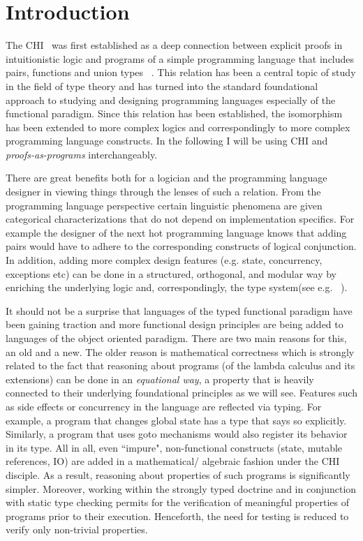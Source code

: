 \chapter{Introduction}\label{intro}
The \acrfull{CHI}~\cite{curry1934functionality,howard1995formulae} was first established as a deep connection between explicit proofs in intuitionistic logic and programs of a simple programming 
language that includes pairs, functions and union types ~\cite{Pierce:2002:TPL:509043,Srensen98lectureson}. This relation has been a central topic of study in the field of type theory and has turned into the standard
foundational approach to studying and designing programming languages especially of the functional paradigm. Since  this relation has been  established, the 
isomorphism has been extended to more complex logics and correspondingly to more complex programming language constructs.  
In the following I will be using \acrfull{CHI} and \emph{proofs-as-programs} interchangeably.

There are great benefits both for a logician
and the programming language designer in viewing things through the lenses of such a relation. From the programming language perspective certain linguistic phenomena are given categorical characterizations that do not 
depend on implementation specifics. 
For example the designer of the next hot programming language  
knows that adding pairs would have to adhere to the corresponding constructs of 
logical conjunction. In addition, adding more complex design features 
(e.g. state, concurrency, exceptions etc) can be done in a structured, orthogonal, 
and modular way by enriching the underlying logic  and, 
correspondingly, the type system(see e.g. ~\cite{Harper:2012:PFP:2431407,CERVESATO20091044,Ong:1997:CFF:263699.263722,DBLP:conf/popl/Griffin90}).

It should not be a surprise that languages of the typed functional paradigm  
have been gaining traction and more functional design principles are being added 
to languages of the object oriented paradigm. There are two main reasons for this, 
an old and a new. The older reason is mathematical correctness which is strongly 
related to the fact that reasoning about programs (of the lambda calculus and its extensions) 
can be done in an \textit{equational way}, a property that is heavily connected 
to their underlying foundational principles as we will see. Features such as side effects 
or concurrency in the language are reflected via typing. For example,  
a program that changes global state has a type that  says so explicitly. Similarly,  
a program that uses goto mechanisms  would also 
register its behavior in its type. 
All in all, even ``impure", non-functional constructs (state, mutable references, IO) are added 
in a mathematical/ algebraic fashion under the \ac{CHI} disciple. 
As a result, reasoning about properties of such programs is significantly simpler. 
Moreover, working within the strongly typed doctrine and in conjunction with static type checking
permits for the verification of meaningful properties of programs
prior to their execution. 
Henceforth, the need for testing is reduced to verify only non-trivial properties. 


